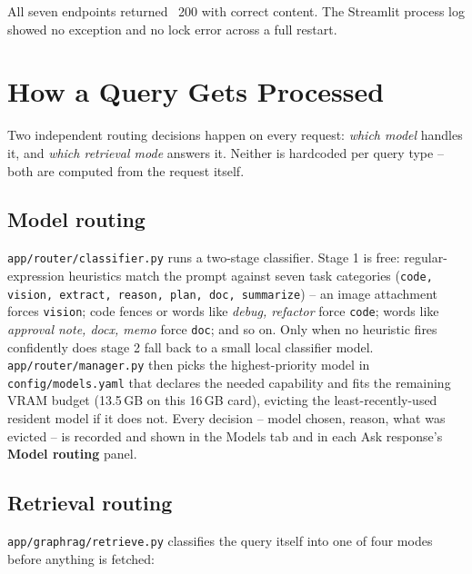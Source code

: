 \documentclass[11pt,a4paper]{article}
\newcommand{\code}[1]{\texttt{\small #1}}
\newcommand{\tick}{{\color{accent2}\textbf{\checkmark}}}
\newcommand{\term}[1]{\textbf{\color{accent}#1}}
\begin{document}
All seven endpoints returned \tick~200 with correct content. The Streamlit
process log showed no exception and no lock error across a full restart.

\section{How a Query Gets Processed}

Two independent routing decisions happen on every request: \emph{which model}
handles it, and \emph{which retrieval mode} answers it. Neither is hardcoded
per query type -- both are computed from the request itself.

\subsection{Model routing}

\code{app/router/classifier.py} runs a two-stage classifier. Stage 1 is free:
regular-expression heuristics match the prompt against seven task categories
(\code{code, vision, extract, reason, plan, doc, summarize}) -- an image
attachment forces \code{vision}; code fences or words like \emph{debug,
refactor} force \code{code}; words like \emph{approval note, docx, memo} force
\code{doc}; and so on. Only when no heuristic fires confidently does stage 2
fall back to a small local classifier model. \code{app/router/manager.py} then
picks the highest-priority model in \code{config/models.yaml} that declares
the needed capability and fits the remaining VRAM budget (13.5\,GB on this
16\,GB card), evicting the least-recently-used resident model if it does not.
Every decision -- model chosen, reason, what was evicted -- is recorded and
shown in the Models tab and in each Ask response's \term{Model routing} panel.

\subsection{Retrieval routing}\label{sec:retrieval}

\code{app/graphrag/retrieve.py} classifies the query itself into one of four
modes before anything is fetched:
\end{document}
